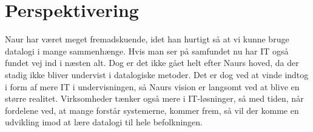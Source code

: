 \section{Perspektivering}
Naur har været meget fremadskuende, idet han hurtigt så at vi kunne bruge datalogi i mange sammenhænge. Hvis man ser på samfundet nu har IT også fundet vej ind i næsten alt. Dog er det ikke gået helt efter Naurs hoved, da der stadig ikke bliver undervist i datalogiske metoder. Det er dog ved at vinde indtog i form af mere IT i undervisningen, så Naurs vision er langsomt ved at blive en større realitet. Virksomheder tænker også mere i IT-løsninger, så med tiden, når fordelene ved, at mange forstår systemerne, kommer frem, så vil der komme en udvikling imod at lære datalogi til hele befolkningen.